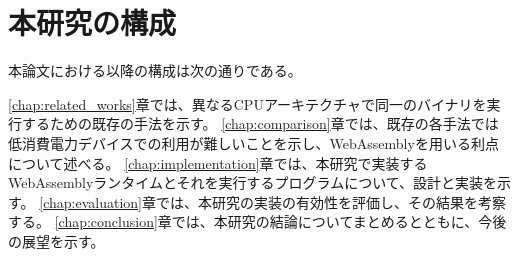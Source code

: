 \section{本研究の構成}

本論文における以降の構成は次の通りである。

\ref{chap:related_works}章では、異なるCPUアーキテクチャで同一のバイナリを実行するための既存の手法を示す。
\ref{chap:comparison}章では、既存の各手法では低消費電力デバイスでの利用が難しいことを示し、WebAssemblyを用いる利点について述べる。
\ref{chap:implementation}章では、本研究で実装するWebAssemblyランタイムとそれを実行するプログラムについて、設計と実装を示す。
\ref{chap:evaluation}章では、本研究の実装の有効性を評価し、その結果を考察する。
\ref{chap:conclusion}章では、本研究の結論についてまとめるとともに、今後の展望を示す。
